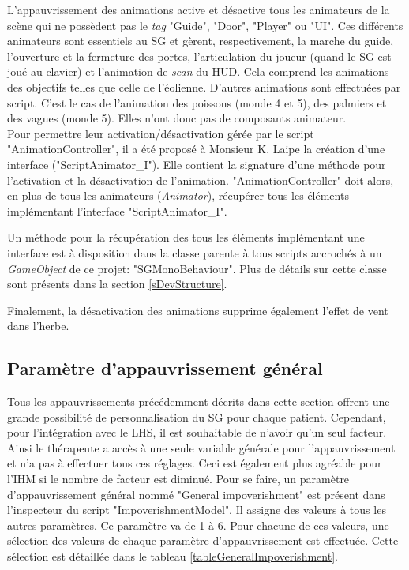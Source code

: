 		L'appauvrissement des animations active et désactive tous les animateurs de la scène qui ne possèdent pas le \textit{tag} "Guide", "Door", "Player" ou "UI". Ces différents animateurs sont essentiels au SG et gèrent, respectivement, la marche du guide, l'ouverture et la fermeture des portes, l'articulation du joueur (quand le SG est joué au clavier) et l'animation de \textit{scan} du HUD. Cela comprend les animations des objectifs telles que celle de l'éolienne. D'autres animations sont effectuées par script. C'est le cas de l'animation des poissons (monde 4 et 5), des palmiers et des vagues (monde 5). Elles n'ont donc pas de composants animateur.	
		\\
			
		Pour permettre leur activation/désactivation gérée par le script "AnimationController", il a été proposé à Monsieur K. Laipe la création d'une interface ("ScriptAnimator\_I"). Elle contient la signature d'une méthode pour l'activation et la désactivation de l'animation. "AnimationController" doit alors, en plus de tous les animateurs (\textit{Animator}), récupérer tous les éléments implémentant l'interface "ScriptAnimator\_I".
		
		Un méthode pour la récupération des tous les éléments implémentant une interface est à disposition dans la classe parente à tous scripts accrochés à un \textit{GameObject} de ce projet: "SGMonoBehaviour". Plus de détails sur cette classe sont présents dans la section \ref{sDevStructure}.	
		
		Finalement, la désactivation des animations supprime également l'effet de vent dans l'herbe.
		
	\subsection*{Paramètre d'appauvrissement général}
		Tous les appauvrissements précédemment décrits dans cette section offrent une grande possibilité de personnalisation du SG pour chaque patient. Cependant, pour l'intégration avec le LHS, il est souhaitable de n'avoir qu'un seul facteur. Ainsi le thérapeute a accès à une seule variable générale pour l'appauvrissement et n'a pas à effectuer tous ces réglages. Ceci est également plus agréable pour l'IHM si le nombre de facteur est diminué. Pour se faire, un paramètre d'appauvrissement général nommé "General impoverishment" est présent dans l'inspecteur du script "ImpoverishmentModel". Il assigne des valeurs à tous les autres paramètres. Ce paramètre va de 1 à 6. Pour chacune de ces valeurs, une sélection des valeurs de chaque paramètre d'appauvrissement est effectuée. Cette sélection est détaillée dans le tableau \ref{tableGeneralImpoverishment}.\medskip
		
